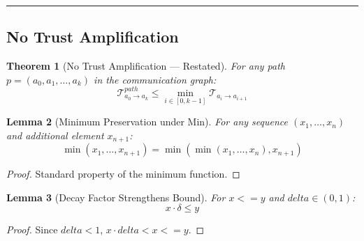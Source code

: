 \documentclass[
]{article}
\newtheorem{theorem}{Theorem}[section]
\newtheorem{lemma}[theorem]{Lemma}
\begin{document}
\begin{center}\rule{0.5\linewidth}{0.5pt}\end{center}

\subsection{No Trust Amplification}\label{sec:thm47-proof}

\begin{theorem}[No Trust Amplification --- Restated]
\label{thm:trust-amp-restated}
For any path $p = (a_0, a_1, \ldots, a_k)$ in the communication graph:
\begin{equation}
\label{eq:trust-amp-restated}
\mathcal{T}_{a_0 \to a_k}^{path} \leq \min_{i \in [0,k-1]} \mathcal{T}_{a_i \to a_{i+1}}
\end{equation}
\end{theorem}

\begin{lemma}[Minimum Preservation under Min]
\label{lem:min-preservation}
For any sequence $(x_1, \ldots, x_n)$ and additional element $x_{n+1}$:
\begin{equation}
\label{eq:min-preservation}
\min(x_1, \ldots, x_{n+1}) = \min(\min(x_1, \ldots, x_n), x_{n+1})
\end{equation}
\end{lemma}

\begin{proof}
Standard property of the minimum function.
\end{proof}

\begin{lemma}[Decay Factor Strengthens Bound]
\label{lem:decay-strengthens}
For $x <= y$ and $delta \in (0,1)$:
\begin{equation}
\label{eq:decay-strengthens}
x \cdot \delta \leq y
\end{equation}
\end{lemma}

\begin{proof}
Since $delta < 1$, $x \cdot delta < x <= y$.
\end{proof}
\end{document}
